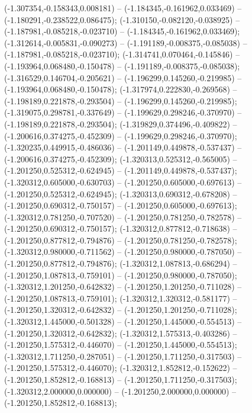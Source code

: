  (-1.307354,-0.158343,0.008181) -- (-1.184345,-0.161962,0.033469) -- (-1.180291,-0.238522,0.086475);
 (-1.310150,-0.082120,-0.038925) -- (-1.187981,-0.085218,-0.023710) -- (-1.184345,-0.161962,0.033469);
 (-1.312614,-0.005831,-0.090273) -- (-1.191189,-0.008375,-0.085038) -- (-1.187981,-0.085218,-0.023710);
 (-1.314741,0.070464,-0.145846) -- (-1.193964,0.068480,-0.150478) -- (-1.191189,-0.008375,-0.085038);
 (-1.316529,0.146704,-0.205621) -- (-1.196299,0.145260,-0.219985) -- (-1.193964,0.068480,-0.150478);
 (-1.317974,0.222830,-0.269568) -- (-1.198189,0.221878,-0.293504) -- (-1.196299,0.145260,-0.219985);
 (-1.319075,0.298781,-0.337649) -- (-1.199629,0.298246,-0.370970) -- (-1.198189,0.221878,-0.293504);
 (-1.319829,0.374496,-0.409822) -- (-1.200616,0.374275,-0.452309) -- (-1.199629,0.298246,-0.370970);
 (-1.320235,0.449915,-0.486036) -- (-1.201149,0.449878,-0.537437) -- (-1.200616,0.374275,-0.452309);
 (-1.320313,0.525312,-0.565005) -- (-1.201250,0.525312,-0.624945) -- (-1.201149,0.449878,-0.537437);
 (-1.320312,0.605000,-0.630703) -- (-1.201250,0.605000,-0.697613) -- (-1.201250,0.525312,-0.624945);
 (-1.320313,0.690312,-0.678208) -- (-1.201250,0.690312,-0.750157) -- (-1.201250,0.605000,-0.697613);
 (-1.320312,0.781250,-0.707520) -- (-1.201250,0.781250,-0.782578) -- (-1.201250,0.690312,-0.750157);
 (-1.320312,0.877812,-0.718638) -- (-1.201250,0.877812,-0.794876) -- (-1.201250,0.781250,-0.782578);
 (-1.320312,0.980000,-0.711562) -- (-1.201250,0.980000,-0.787050) -- (-1.201250,0.877812,-0.794876);
 (-1.320312,1.087813,-0.686294) -- (-1.201250,1.087813,-0.759101) -- (-1.201250,0.980000,-0.787050);
 (-1.320312,1.201250,-0.642832) -- (-1.201250,1.201250,-0.711028) -- (-1.201250,1.087813,-0.759101);
 (-1.320312,1.320312,-0.581177) -- (-1.201250,1.320312,-0.642832) -- (-1.201250,1.201250,-0.711028);
 (-1.320312,1.445000,-0.501328) -- (-1.201250,1.445000,-0.554513) -- (-1.201250,1.320312,-0.642832);
 (-1.320312,1.575313,-0.403286) -- (-1.201250,1.575312,-0.446070) -- (-1.201250,1.445000,-0.554513);
 (-1.320312,1.711250,-0.287051) -- (-1.201250,1.711250,-0.317503) -- (-1.201250,1.575312,-0.446070);
 (-1.320312,1.852812,-0.152622) -- (-1.201250,1.852812,-0.168813) -- (-1.201250,1.711250,-0.317503);
 (-1.320312,2.000000,0.000000) -- (-1.201250,2.000000,0.000000) -- (-1.201250,1.852812,-0.168813);
